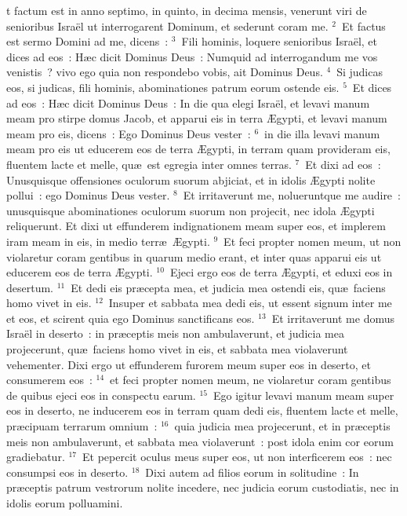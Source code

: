 \bchapter
{}t factum est in anno septimo, in quinto, in decima mensis, venerunt viri de senioribus Isra\"el ut interrogarent Dominum, et sederunt coram me.
${}^{2}$~Et factus est sermo Domini ad me, dicens~:
${}^{3}$~Fili hominis, loquere senioribus Isra\"el, et dices ad eos~: H\ae c dicit Dominus Deus~: Numquid ad interrogandum me vos venistis~? vivo ego quia non respondebo vobis, ait Dominus Deus.
${}^{4}$~Si judicas eos, si judicas, fili hominis, abominationes patrum eorum ostende eis.
${}^{5}$~Et dices ad eos~: H\ae c dicit Dominus Deus~: In die qua elegi Isra\"el, et levavi manum meam pro stirpe domus Jacob, et apparui eis in terra \AE gypti, et levavi manum meam pro eis, dicens~: Ego Dominus Deus vester~:
${}^{6}$~in die illa levavi manum meam pro eis ut educerem eos de terra \AE gypti, in terram quam provideram eis, fluentem lacte et melle, qu\ae\ est egregia inter omnes terras.
${}^{7}$~Et dixi ad eos~: Unusquisque offensiones oculorum suorum abjiciat, et in idolis \AE gypti nolite pollui~: ego Dominus Deus vester.
${}^{8}$~Et irritaverunt me, nolueruntque me audire~: unusquisque abominationes oculorum suorum non projecit, nec idola \AE gypti reliquerunt. Et dixi ut effunderem indignationem meam super eos, et implerem iram meam in eis, in medio terr\ae\ \AE gypti.
${}^{9}$~Et feci propter nomen meum, ut non violaretur coram gentibus in quarum medio erant, et inter quas apparui eis ut educerem eos de terra \AE gypti.
${}^{10}$~Ejeci ergo eos de terra \AE gypti, et eduxi eos in desertum.
${}^{11}$~Et dedi eis pr\ae cepta mea, et judicia mea ostendi eis, qu\ae\ faciens homo vivet in eis.
${}^{12}$~Insuper et sabbata mea dedi eis, ut essent signum inter me et eos, et scirent quia ego Dominus sanctificans eos.
${}^{13}$~Et irritaverunt me domus Isra\"el in deserto~: in pr\ae ceptis meis non ambulaverunt, et judicia mea projecerunt, qu\ae\ faciens homo vivet in eis, et sabbata mea violaverunt vehementer. Dixi ergo ut effunderem furorem meum super eos in deserto, et consumerem eos~:
${}^{14}$~et feci propter nomen meum, ne violaretur coram gentibus de quibus ejeci eos in conspectu earum.
${}^{15}$~Ego igitur levavi manum meam super eos in deserto, ne inducerem eos in terram quam dedi eis, fluentem lacte et melle, pr\ae cipuam terrarum omnium~:
${}^{16}$~quia judicia mea projecerunt, et in pr\ae ceptis meis non ambulaverunt, et sabbata mea violaverunt~: post idola enim cor eorum gradiebatur.
${}^{17}$~Et pepercit oculus meus super eos, ut non interficerem eos~: nec consumpsi eos in deserto.
${}^{18}$~Dixi autem ad filios eorum in solitudine~: In pr\ae ceptis patrum vestrorum nolite incedere, nec judicia eorum custodiatis, nec in idolis eorum polluamini.
